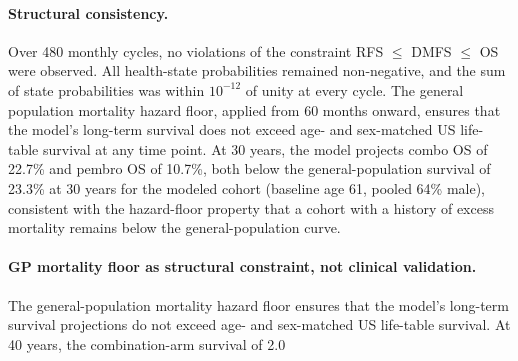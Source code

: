 \documentclass[12pt,a4paper]{article}
\begin{document}
\paragraph{Structural consistency.} Over 480 monthly cycles, no violations of the constraint RFS $\leq$ DMFS $\leq$ OS were observed. All health-state probabilities remained non-negative, and the sum of state probabilities was within $10^{-12}$ of unity at every cycle. The general population mortality hazard floor, applied from 60 months onward, ensures that the model's long-term survival does not exceed age- and sex-matched US life-table survival at any time point. At 30 years, the model projects combo OS of 22.7\% and pembro OS of 10.7\%, both below the general-population survival of 23.3\% at 30 years for the modeled cohort (baseline age 61, pooled 64\% male), consistent with the hazard-floor property that a cohort with a history of excess mortality remains below the general-population curve.

\paragraph{GP mortality floor as structural constraint, not clinical validation.} The general-population mortality hazard floor ensures that the model's long-term survival projections do not exceed age- and sex-matched US life-table survival. At 40 years, the combination-arm survival of 2.0\\%
\end{document}

